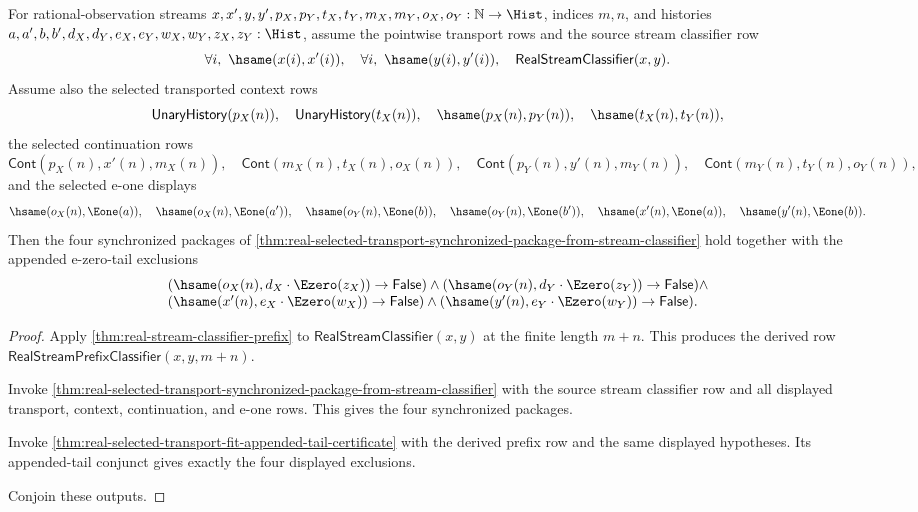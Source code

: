 \begin{theorem}
\label{thm:real-selected-transport-synchronized-appended-tail-package-from-stream-classifier}
For rational-observation streams $x,x',y,y',p_X,p_Y,t_X,t_Y,m_X,m_Y,o_X,o_Y:\mathbb{N}\to\Hist$,
indices $m,n$, and histories $a,a',b,b',d_X,d_Y,e_X,e_Y,w_X,w_Y,z_X,z_Y:\Hist$, assume the pointwise transport rows and the source stream classifier row
$$
\forall i,\ \hsame(x(i),x'(i)),\quad \forall i,\ \hsame(y(i),y'(i)),\quad \mathsf{RealStreamClassifier}(x,y).
$$
Assume also the selected transported context rows
$$
\mathsf{UnaryHistory}(p_X(n)),\quad \mathsf{UnaryHistory}(t_X(n)),\quad \hsame(p_X(n),p_Y(n)),\quad \hsame(t_X(n),t_Y(n)),
$$
the selected continuation rows
$$
\mathsf{Cont}(p_X(n),x'(n),m_X(n)),\quad \mathsf{Cont}(m_X(n),t_X(n),o_X(n)),\quad
\mathsf{Cont}(p_Y(n),y'(n),m_Y(n)),\quad \mathsf{Cont}(m_Y(n),t_Y(n),o_Y(n)),
$$
and the selected e-one displays
$$
\hsame(o_X(n),\Eone(a)),\quad \hsame(o_X(n),\Eone(a')),\quad \hsame(o_Y(n),\Eone(b)),\quad \hsame(o_Y(n),\Eone(b')),\quad
\hsame(x'(n),\Eone(a)),\quad \hsame(y'(n),\Eone(b)).
$$
Then the four synchronized packages of \autoref{thm:real-selected-transport-synchronized-package-from-stream-classifier} hold together with the appended e-zero-tail exclusions
$$
\begin{array}{l}
(\hsame(o_X(n),d_X\cdot\Ezero(z_X))\to\mathsf{False})\land
(\hsame(o_Y(n),d_Y\cdot\Ezero(z_Y))\to\mathsf{False})\land\\
(\hsame(x'(n),e_X\cdot\Ezero(w_X))\to\mathsf{False})\land
(\hsame(y'(n),e_Y\cdot\Ezero(w_Y))\to\mathsf{False}).
\end{array}
$$
\end{theorem}
\begin{proof}
Apply \autoref{thm:real-stream-classifier-prefix} to
$\mathsf{RealStreamClassifier}(x,y)$ at the finite length $m+n$. This produces
the derived row $\mathsf{RealStreamPrefixClassifier}(x,y,m+n)$.

Invoke \autoref{thm:real-selected-transport-synchronized-package-from-stream-classifier}
with the source stream classifier row and all displayed transport, context, continuation, and e-one rows. This gives the four synchronized packages.

Invoke \autoref{thm:real-selected-transport-fit-appended-tail-certificate} with
the derived prefix row and the same displayed hypotheses. Its appended-tail
conjunct gives exactly the four displayed exclusions.

Conjoin these outputs.
\end{proof}

